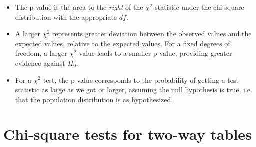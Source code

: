 \begin{itemize}
\item The p-value is the area to the \emph{right} of the $\chi^2$-statistic under the chi-square distribution with the appropriate $df$.

\item A larger $\chi^2$ represents greater deviation between the observed values and the expected values, relative to the expected values.  For a fixed degrees of freedom, a larger $\chi^2$ value leads to a smaller p-value, providing greater evidence against $H_0$. 

\item For a $\chi^2$ test, the p-value corresponds to the probability of getting a test statistic as large as we got or larger, assuming the null hypothesis is true, i.e. that the population distribution is as hypothesized.
\end{itemize}


{}


\section[Chi-square tests for two-way tables]{Chi-square tests for two-way tables }
\label{twoWayTablesAndChiSquare}

